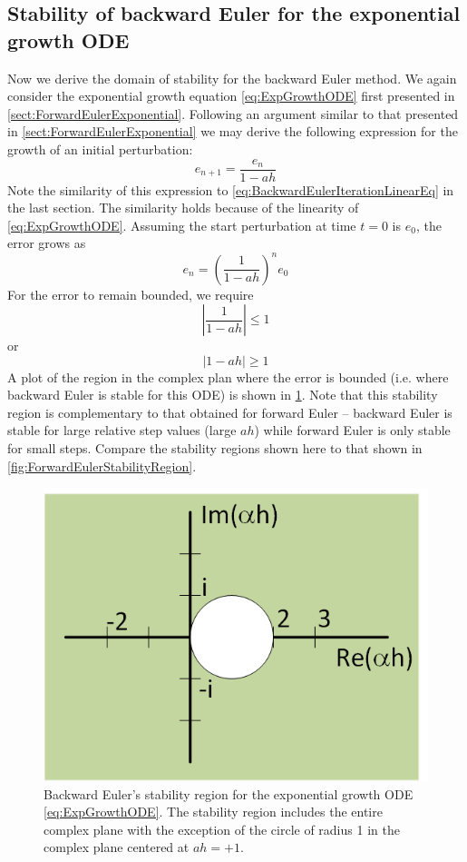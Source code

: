 \documentclass[hidelinks,notitlepage]{book}
\begin{document}
\subsection{Stability of backward Euler for the exponential growth ODE}
Now we derive the domain of stability for the backward Euler method.  We again consider the exponential growth equation \cref{eq:ExpGrowthODE} first presented in \cref{sect:ForwardEulerExponential}.  Following an argument similar to that presented in \cref{sect:ForwardEulerExponential} we may derive the following expression for the growth of an initial perturbation:
\begin{equation}
\nonumber
e_{n+1} = \frac{e_n}{1 - a h}
\end{equation}
Note the similarity of this expression to \cref{eq:BackwardEulerIterationLinearEq} in the last section.  The similarity holds because of the linearity of \cref{eq:ExpGrowthODE}.  
Assuming the start perturbation at time $t=0$ is $e_0$, the error grows as
\begin{equation}
e_n = \left( \frac{1}{1-a h} \right)^n e_0
\end{equation}
For the error to remain bounded, we require
\begin{equation}
\nonumber
\left| \frac{1}{1-a h} \right| \le 1
\end{equation}
or
\begin{equation}
\left| 1-a h \right| \ge 1
\end{equation}
A plot of the region in the complex plan where the error is bounded (i.e. where backward Euler is stable for this ODE) is shown in \cref{fig:BackwardEulerStabilityRegion}.  Note that this stability region is complementary to that obtained for forward Euler -- backward Euler is stable for large relative step values (large $a h$) while forward Euler is only stable for small steps.  Compare the stability regions shown here to that shown in \cref{fig:ForwardEulerStabilityRegion}.
\begin{figure}[tbh]
	\centering
	\includegraphics[width=0.5\columnwidth]{BackwardEulerStabilityRegion.png}
	\caption{Backward Euler's stability region for the exponential growth ODE \cref{eq:ExpGrowthODE}.  The stability region includes the entire complex plane with the exception of the circle of radius 1 in the complex plane centered at $a h = +1$.}
	\label{fig:BackwardEulerStabilityRegion}
\end{figure}
\end{document}
